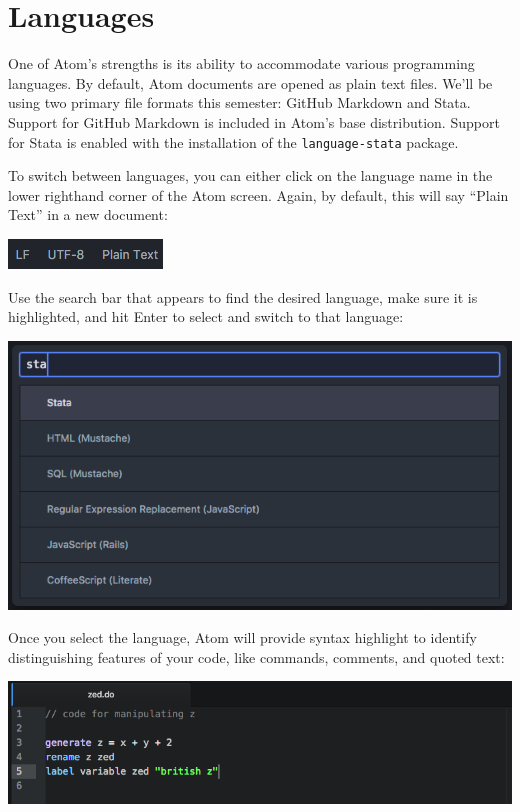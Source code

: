 \documentclass[]{book}
\theoremstyle{definition}
\theoremstyle{definition}
\theoremstyle{definition}
\theoremstyle{remark}
\begin{document}
\section{Languages}\label{languages}

One of Atom's strengths is its ability to accommodate various
programming languages. By default, Atom documents are opened as plain
text files. We'll be using two primary file formats this semester:
GitHub Markdown and Stata. Support for GitHub Markdown is included in
Atom's base distribution. Support for Stata is enabled with the
installation of the \texttt{language-stata} package.

To switch between languages, you can either click on the language name
in the lower righthand corner of the Atom screen. Again, by default,
this will say ``Plain Text'' in a new document:

\includegraphics[width=0.35\linewidth]{images/atomLanguages}

Use the search bar that appears to find the desired language, make sure
it is highlighted, and hit Enter to select and switch to that language:

\includegraphics[width=0.75\linewidth]{images/atomLangSelector}

Once you select the language, Atom will provide syntax highlight to
identify distinguishing features of your code, like commands, comments,
and quoted text:

\includegraphics[width=1\linewidth]{images/atomHighlight}
\end{document}
